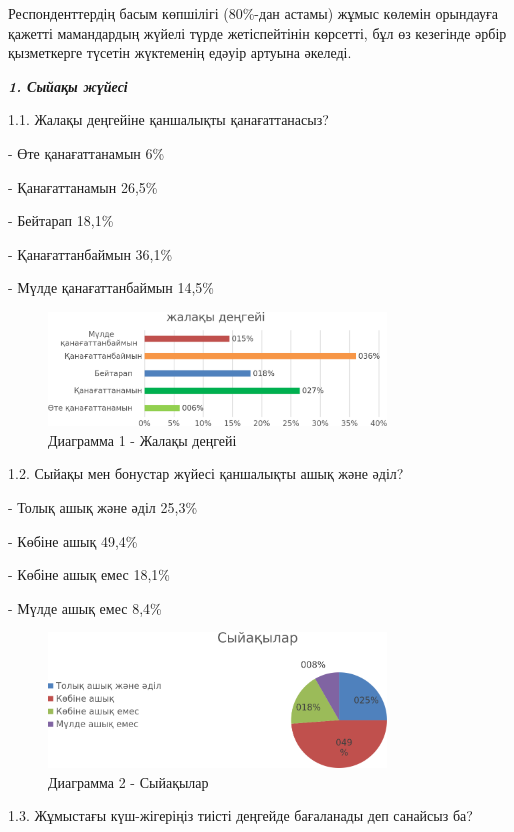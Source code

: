 \begin{multicols}{2}
Респонденттердің басым көпшілігі (80\%-дан астамы) жұмыс көлемін
орындауға қажетті мамандардың жүйелі түрде жетіспейтінін көрсетті, бұл
өз кезегінде әрбір қызметкерге түсетін жүктеменің едәуір артуына
әкеледі.

\emph{{\bfseries 1. Сыйақы жүйесі}}

1.1. Жалақы деңгейіне қаншалықты қанағаттанасыз?

- Өте қанағаттанамын 6\%

- Қанағаттанамын 26,5\%

- Бейтарап 18,1\%

- Қанағаттанбаймын 36,1\%

- Мүлде қанағаттанбаймын 14,5\%
\end{multicols}

\begin{figure}[H]
	\centering
	\includegraphics[width=0.8\textwidth]{media/ekon2/image13}
	\caption*{Диаграмма 1 - Жалақы деңгейі}
\end{figure}

1.2. Сыйақы мен бонустар жүйесі қаншалықты ашық және әділ?

- Толық ашық және әділ 25,3\%

- Көбіне ашық 49,4\%

- Көбіне ашық емес 18,1\%

- Мүлде ашық емес 8,4\%

\begin{figure}[H]
	\centering
	\includegraphics[width=0.8\textwidth]{media/ekon2/image14}
	\caption*{Диаграмма 2 - Сыйақылар}
\end{figure}

1.3. Жұмыстағы күш-жігеріңіз тиісті деңгейде бағаланады деп санайсыз ба?

